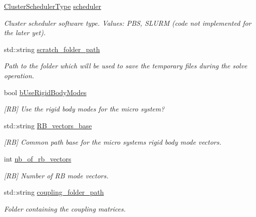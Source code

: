 \begin{DoxyCompactItemize}
\item 
\hyperlink{namespacecarl_a67066fdf35a0c326f5147098c0cf45d1}{Cluster\+Scheduler\+Type} \hyperlink{structcarl_1_1feti__iterate__params_a5154ac3475a52b9973386fde31d82c83}{scheduler}
\begin{DoxyCompactList}\small\item\em Cluster scheduler software type. {\itshape Values}\+: P\+B\+S, S\+L\+U\+R\+M (code not implemented for the later yet). \end{DoxyCompactList}\item 
std\+::string \hyperlink{structcarl_1_1feti__iterate__params_a6f87360ece51431590f3a03f15945e55}{scratch\+\_\+folder\+\_\+path}
\begin{DoxyCompactList}\small\item\em Path to the folder which will be used to save the temporary files during the solve operation. \end{DoxyCompactList}\item 
bool \hyperlink{structcarl_1_1feti__iterate__params_a934be934df429fddea7600c8965bca89}{b\+Use\+Rigid\+Body\+Modes}
\begin{DoxyCompactList}\small\item\em \mbox{[}R\+B\mbox{]} Use the rigid body modes for the micro system? \end{DoxyCompactList}\item 
std\+::string \hyperlink{structcarl_1_1feti__iterate__params_aa1d86f53ac7316537089cda134f7dd00}{R\+B\+\_\+vectors\+\_\+base}
\begin{DoxyCompactList}\small\item\em \mbox{[}R\+B\mbox{]} Common path base for the micro system\textquotesingle{}s rigid body mode vectors. \end{DoxyCompactList}\item 
int \hyperlink{structcarl_1_1feti__iterate__params_a5565d7f7666b2417af811d423e37d270}{nb\+\_\+of\+\_\+rb\+\_\+vectors}
\begin{DoxyCompactList}\small\item\em \mbox{[}R\+B\mbox{]} Number of R\+B mode vectors. \end{DoxyCompactList}\item 
std\+::string \hyperlink{structcarl_1_1feti__iterate__params_a198b85f203c17fa0f5973f9c2ced2110}{coupling\+\_\+folder\+\_\+path}
\begin{DoxyCompactList}\small\item\em Folder containing the coupling matrices. \end{DoxyCompactList}\item 

\end{DoxyCompactItemize}
